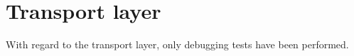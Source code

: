 \section{Transport layer}
With regard to the transport layer, only debugging tests have been performed. 